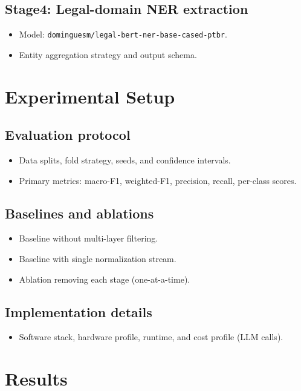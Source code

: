 \documentclass[a4paper,fleqn]{cas-sc}
\begin{document}
\subsection{Stage4: Legal-domain NER extraction}
\begin{itemize}
    \item Model: \texttt{dominguesm/legal-bert-ner-base-cased-ptbr}.
    \item Entity aggregation strategy and output schema.
\end{itemize}

\section{Experimental Setup}
\label{sec:experiments}
\subsection{Evaluation protocol}
\begin{itemize}
    \item Data splits, fold strategy, seeds, and confidence intervals.
    \item Primary metrics: macro-F1, weighted-F1, precision, recall, per-class scores.
\end{itemize}

\subsection{Baselines and ablations}
\begin{itemize}
    \item Baseline without multi-layer filtering.
    \item Baseline with single normalization stream.
    \item Ablation removing each stage (one-at-a-time).
\end{itemize}

\subsection{Implementation details}
\begin{itemize}
    \item Software stack, hardware profile, runtime, and cost profile (LLM calls).
\end{itemize}

\section{Results}
\label{sec:results}
\end{document}

